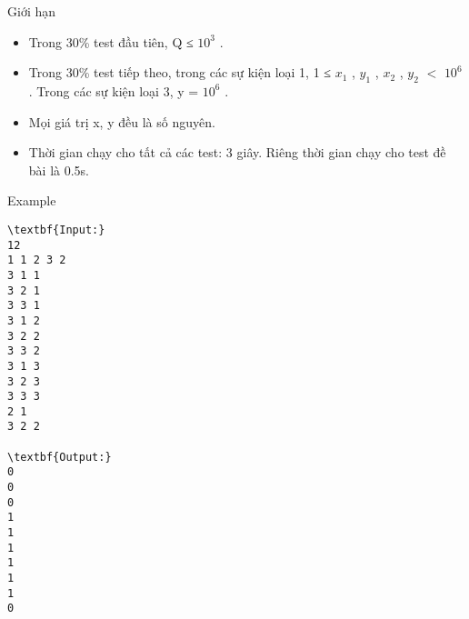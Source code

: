 Giới hạn
\begin{itemize}
	\item Trong 30\% test đầu tiên, Q ≤ $10^{3}$ .
	\item Trong 30\% test tiếp theo, trong các sự kiện loại 1, 1 ≤ $x_{1}$ , $y_{1}$ , $x_{2}$ , $y_{2}$ $<$ $10^{6}$ . Trong các sự kiện loại 3, y = $10^{6}$ .
	\item Mọi giá trị x, y đều là số nguyên.
	\item Thời gian chạy cho tất cả các test: 3 giây. Riêng thời gian chạy cho test đề bài là 0.5s.
\end{itemize}
Example
\begin{verbatim}
\textbf{Input:}
12
1 1 2 3 2
3 1 1
3 2 1
3 3 1
3 1 2
3 2 2
3 3 2
3 1 3
3 2 3
3 3 3
2 1
3 2 2

\textbf{Output:}
0
0
0
1
1
1
1
1
1
0
\end{verbatim}